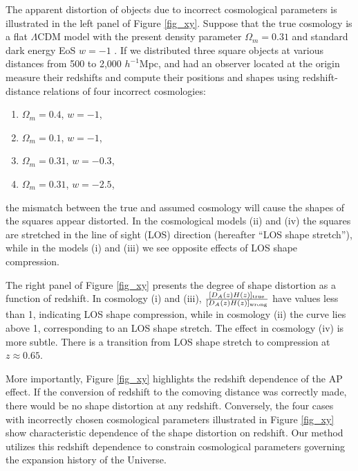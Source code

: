 \documentclass[iop]{emulateapj}
\begin{document}
The apparent distortion of objects due to incorrect cosmological parameters is illustrated in the left panel of Figure \ref{fig_xy}.
Suppose that the true cosmology is a flat $\Lambda$CDM model with the present density parameter $\Omega_m=0.31$
and standard dark energy EoS $w=-1$ \citep[the best $\Lambda$CDM model determined by Planck 2015 results][]{Planck2015}.
If we distributed three square objects at various distances from 500 to 2,000 $h^{-1}$Mpc,
and had an observer located at the origin measure their redshifts and compute their positions and shapes 
using redshift-distance relations of four incorrect cosmologies:
\begin{enumerate}[label=(\roman*)]
\item $\Omega_m=0.4$, $w=-1$,
\item $\Omega_m=0.1$, $w=-1$,
\item $\Omega_m=0.31$, $w=-0.3$,
\item $\Omega_m=0.31$, $w=-2.5$,
\end{enumerate}
the mismatch between the true and assumed cosmology will cause the shapes of the squares appear distorted.
In the cosmological models (ii) and (iv) the squares are stretched in the line of sight (LOS) direction (hereafter ``LOS shape stretch''),
while in the models (i) and (iii) we see opposite effects of LOS shape compression.


The right panel of Figure \ref{fig_xy} presents the degree of shape distortion as a function of redshift. 
In cosmology (i) and (iii), $\frac{[D_A(z)H(z)]_{\rm true}}{[D_A(z)H(z)]_{\rm wrong}}$ have values less than 1, 
indicating LOS shape compression,
while in cosmology (ii) the curve lies above 1, 
corresponding to an LOS shape stretch.
The effect in cosmology (iv) is more subtle. 
There is a transition from LOS shape stretch to compression at $z \approx 0.65$.

More importantly, Figure \ref{fig_xy} highlights the redshift dependence of the AP effect. 
If the conversion of redshift to the comoving distance was correctly made,
there would be no shape distortion at any redshift.
Conversely, the four cases with incorrectly chosen cosmological parameters illustrated 
in Figure \ref{fig_xy} 
show characteristic dependence of the shape distortion on redshift.
Our method utilizes this redshift dependence to constrain cosmological parameters
governing the expansion history of the Universe.
\end{document}

